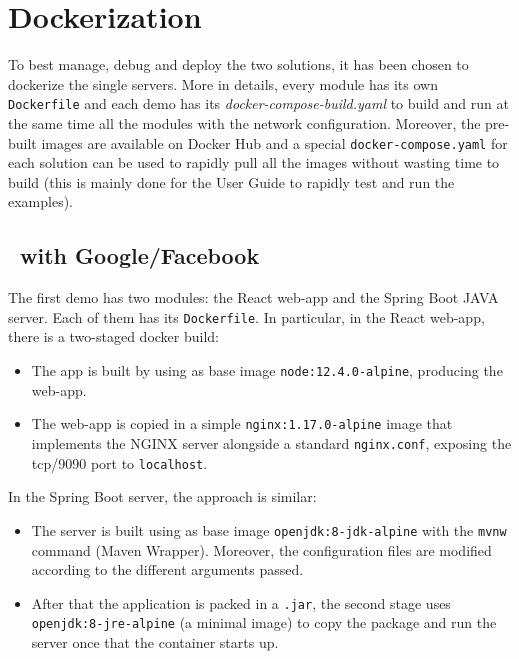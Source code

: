 \section{Dockerization}
To best manage, debug and deploy the two solutions, it has been chosen to dockerize the single servers. More in details, every module has its own \texttt{Dockerfile} and each demo has its \textit{docker-compose-build.yaml} to build and run at the same time all the modules with the network configuration. Moreover, the pre-built images are available on Docker Hub and a special \texttt{docker-compose.yaml} for each solution can be used to rapidly pull all the images without wasting time to build (this is mainly done for the User Guide to rapidly test and run the examples).

\subsection{\oauth\ with Google/Facebook}
The first demo has two modules: the React web-app and the Spring Boot JAVA server. Each of them has its \texttt{Dockerfile}. In particular, in the React web-app, there is a two-staged docker build:

\begin{itemize}
    \item The app is built by using as base image \texttt{node:12.4.0-alpine}, producing the web-app.
    \item The web-app is copied in a simple \texttt{nginx:1.17.0-alpine} image that implements the NGINX server alongside a standard \texttt{nginx.conf}, exposing the tcp/9090 port to \texttt{localhost}.
\end{itemize}

\noindent In the Spring Boot server, the approach is similar:

\begin{itemize}
    \item The server is built using as base image \texttt{openjdk:8-jdk-alpine} with the \texttt{mvnw} command (Maven Wrapper). Moreover, the configuration files are modified according to the different arguments passed.
    \item After that the application is packed in a \texttt{.jar}, the second stage uses \texttt{openjdk:8-jre-alpine} (a minimal image) to copy the package and run the server once that the container starts up.
\end{itemize}


